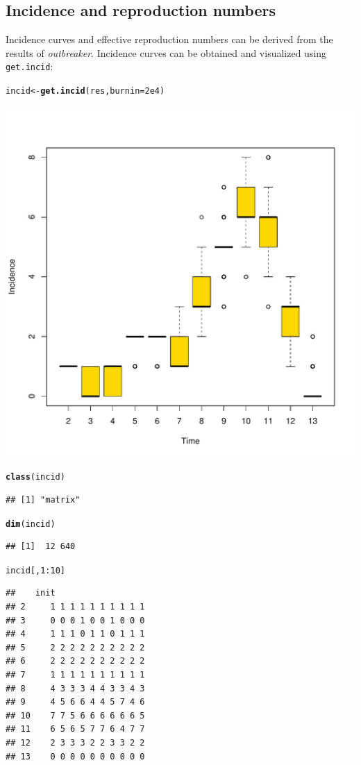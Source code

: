 \documentclass{article}\usepackage[]{graphicx}\usepackage[]{color}
\makeatletter
\newcommand{\hlnum}[1]{\textcolor[rgb]{0.686,0.059,0.569}{#1}}%
\newcommand{\hlopt}[1]{\textcolor[rgb]{0,0,0}{#1}}%
\newcommand{\hlstd}[1]{\textcolor[rgb]{0.345,0.345,0.345}{#1}}%
\newcommand{\hlkwb}[1]{\textcolor[rgb]{0.69,0.353,0.396}{#1}}%
\newcommand{\hlkwc}[1]{\textcolor[rgb]{0.333,0.667,0.333}{#1}}%
\newcommand{\hlkwd}[1]{\textcolor[rgb]{0.737,0.353,0.396}{\textbf{#1}}}%
\newenvironment{kframe}{%
 \def\at@end@of@kframe{}%
 \ifinner\ifhmode%
  \def\at@end@of@kframe{\end{minipage}}%
  \begin{minipage}{\columnwidth}%
 \fi\fi%
 \def\FrameCommand##1{\hskip\@totalleftmargin \hskip-\fboxsep
 \colorbox{shadecolor}{##1}\hskip-\fboxsep
     \hskip-\linewidth \hskip-\@totalleftmargin \hskip\columnwidth}%
 \MakeFramed {\advance\hsize-\width
   \@totalleftmargin\z@ \linewidth\hsize
   \@setminipage}}%
 {\par\unskip\endMakeFramed%
 \at@end@of@kframe}
\newenvironment{knitrout}{}{} %
\makeatother
\begin{document}
\subsection{Incidence and reproduction numbers}

Incidence curves and effective reproduction numbers can be derived from the results of \textit{outbreaker}.
Incidence curves can be obtained and visualized using \texttt{get.incid}:
\begin{knitrout}
\color{fgcolor}\begin{kframe}
\begin{alltt}
\hlstd{incid} \hlkwb{<-} \hlkwd{get.incid}\hlstd{(res,} \hlkwc{burnin}\hlstd{=}\hlnum{2e4}\hlstd{)}
\end{alltt}
\end{kframe}

{\centering \includegraphics[width=.6\textwidth]{figs/unnamed-chunk-45} 

}


\begin{kframe}\begin{alltt}
\hlkwd{class}\hlstd{(incid)}
\end{alltt}
\begin{verbatim}
## [1] "matrix"
\end{verbatim}
\begin{alltt}
\hlkwd{dim}\hlstd{(incid)}
\end{alltt}
\begin{verbatim}
## [1]  12 640
\end{verbatim}
\begin{alltt}
\hlstd{incid[,}\hlnum{1}\hlopt{:}\hlnum{10}\hlstd{]}
\end{alltt}
\begin{verbatim}
##    init                  
## 2     1 1 1 1 1 1 1 1 1 1
## 3     0 0 0 1 0 0 1 0 0 0
## 4     1 1 1 0 1 1 0 1 1 1
## 5     2 2 2 2 2 2 2 2 2 2
## 6     2 2 2 2 2 2 2 2 2 2
## 7     1 1 1 1 1 1 1 1 1 1
## 8     4 3 3 3 4 4 3 3 4 3
## 9     4 5 6 6 4 4 5 7 4 6
## 10    7 7 5 6 6 6 6 6 6 5
## 11    6 5 6 5 7 7 6 4 7 7
## 12    2 3 3 3 2 2 3 3 2 2
## 13    0 0 0 0 0 0 0 0 0 0
\end{verbatim}
\end{kframe}
\end{knitrout}
\end{document}
